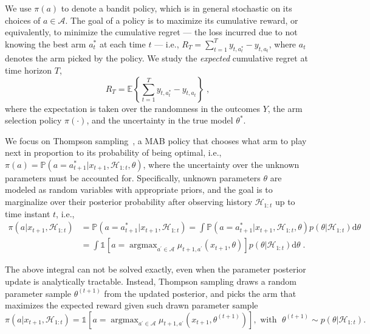 \documentclass{article}
\newcommand{\eValue}[2]{\mathbb{E}_{#1}\left\{ #2 \right\}}
\newcommand{\Prob}[1]{\mathbb{P}\left( #1 \right)}
\newcommand{\myind}[1]{\ind{}\left[#1\right]}
\newcommand{\dd}[1]{\mathrm{d} #1}
\newcommand{\A}{\mathcal{A}}
\newcommand{\astar}{a^*}
\newcommand{\thetastar}{\theta^*}
\newcommand{\HH}{\mathcal{H}}
\newcommand{\ie}{i.e., }
\newcommand{\argmax}{\mathop{\mathrm{argmax}}}
\newcommand{\ind}[1]{\mathds{1}_{#1}} %
\begin{document}
We use $\pi(a)$ to denote a bandit policy, which is in general stochastic on its choices of $a\in\A$. The goal of a policy is to maximize its cumulative reward, or equivalently, to minimize the cumulative regret --- the loss incurred due to not knowing the best arm $a_t^*$ at each time $t$ --- \ie $R_T=\sum_{t=1}^T y_{t,\astar_t}-y_{t,a_t}$, where $a_t$ denotes the arm picked by the policy. We study the \emph{expected} cumulative regret at time horizon $T$,
\begin{equation}
R_T=\eValue{}{\sum_{t=1}^T y_{t,\astar_t}-y_{t,a_t} } \; ,
\label{eq:cumulative_regret}
\end{equation}
where the expectation is taken over the randomness in the outcomes $Y$, the arm selection policy $\pi(\cdot)$, and the uncertainty in the true model $\thetastar$.

We focus on Thompson sampling~\cite{j-Russo2018}, a MAB policy that chooses what arm to play next in proportion to its probability of being optimal, \ie $\pi(a) = \Prob{a=a_{t+1}^*|x_{t+1}, \HH_{1:t}, \theta}$, where the uncertainty over the unknown parameters must be accounted for. Specifically, unknown parameters $\theta$  are modeled as random variables with appropriate priors, and the goal is to marginalize over their posterior probability after observing  history $\HH_{1:t}$ up to time instant $t$, \ie
\vspace*{-1ex}
\begin{equation}
\begin{split}
\pi(a|x_{t+1},\HH_{1:t})&=\Prob{a=a_{t+1}^*|x_{t+1},\HH_{1:t}} = \int \Prob{a=a_{t+1}^*|x_{t+1},\HH_{1:t},\theta} p(\theta|\HH_{1:t}) \dd{\theta} \\
&=\int \myind{a=\argmax_{a^\prime \in \A} \mu_{t+1,a^\prime}(x_{t+1},\theta)} p(\theta|\HH_{1:t}) \dd{\theta} \; .
\end{split}
\label{eq:theta_unknown_pr_arm_optimal}
\end{equation}

The above integral can not be solved exactly, even when the parameter posterior update is analytically tractable. Instead, Thompson sampling draws a random parameter sample $\theta^{(t+1)}$ from the updated posterior, and picks the arm that maximizes the expected reward given such drawn parameter sample
\begin{equation}
\pi(a|x_{t+1},\HH_{1:t})=\myind{a=\argmax_{a^\prime \in \A} \mu_{t+1,a^\prime}(x_{t+1},\theta^{(t+1)})}, \text{ with } \; \theta^{(t+1)} \sim p(\theta|\HH_{1:t}) .
\nonumber
\end{equation}
\end{document}
